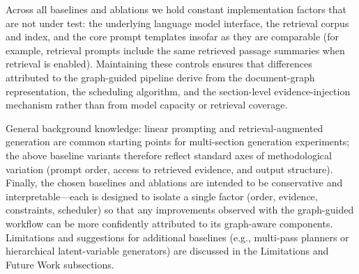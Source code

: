 Across all baselines and ablations we hold constant implementation factors that are not under test: the underlying language model interface, the retrieval corpus and index, and the core prompt templates insofar as they are comparable (for example, retrieval prompts include the same retrieved passage summaries when retrieval is enabled). Maintaining these controls ensures that differences attributed to the graph-guided pipeline derive from the document-graph representation, the scheduling algorithm, and the section-level evidence-injection mechanism rather than from model capacity or retrieval coverage.

General background knowledge: linear prompting and retrieval-augmented generation are common starting points for multi‑section generation experiments; the above baseline variants therefore reflect standard axes of methodological variation (prompt order, access to retrieved evidence, and output structure). Finally, the chosen baselines and ablations are intended to be conservative and interpretable—each is designed to isolate a single factor (order, evidence, constraints, scheduler) so that any improvements observed with the graph-guided workflow can be more confidently attributed to its graph-aware components. Limitations and suggestions for additional baselines (e.g., multi‑pass planners or hierarchical latent-variable generators) are discussed in the Limitations and Future Work subsections.